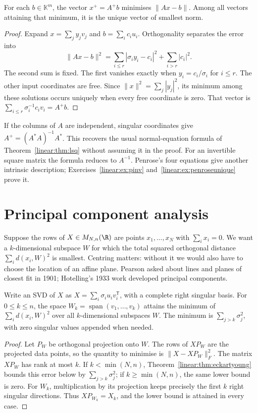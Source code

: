 \begin{theorem}\label{linear:thm:pinv}
For each $b\in\mathbb K^m$, the vector $x^+=A^+b$ minimises $\|Ax-b\|$. Among all vectors attaining that minimum, it is the unique vector of smallest norm.
\end{theorem}
\begin{proof}
Expand $x=\sum_jy_jv_j$ and $b=\sum_ic_iu_i$. Orthogonality separates the error into
\[
\|Ax-b\|^2=\sum_{i\le r}|\sigma_iy_i-c_i|^2+\sum_{i>r}|c_i|^2.
\]
The second sum is fixed. The first vanishes exactly when $y_i=c_i/\sigma_i$ for $i\le r$. The other input coordinates are free. Since $\|x\|^2=\sum_j|y_j|^2$, its minimum among these solutions occurs uniquely when every free coordinate is zero. That vector is $\sum_{i\le r}\sigma_i^{-1}c_iv_i=A^+b$.
\end{proof}

If the columns of $A$ are independent, singular coordinates give $A^+=(A^*A)^{-1}A^*$. This recovers the usual normal-equation formula of Theorem~\ref{linear:thm:lsq} without assuming it in the proof. For an invertible square matrix the formula reduces to $A^{-1}$. Penrose's four equations give another intrinsic description; Exercises~\ref{linear:ex:pinv} and~\ref{linear:ex:penroseunique} prove it.

\section{Principal component analysis}

Suppose the rows of $X\in M_{N,n}(\R)$ are points $x_1,\ldots,x_N$ with $\sum_ix_i=0$. We want a $k$-dimensional subspace $W$ for which the total squared orthogonal distance $\sum_id(x_i,W)^2$ is smallest. Centring matters: without it we would also have to choose the location of an affine plane. Pearson asked about lines and planes of closest fit in 1901; Hotelling's 1933 work developed principal components.

\begin{theorem}\label{linear:thm:pca}
Write an SVD of $X$ as $X=\sum_i\sigma_iu_iv_i^{\mathsf T}$, with a complete right singular basis. For $0\le k\le n$, the space $W_k=\operatorname{span}(v_1,\ldots,v_k)$ attains the minimum of $\sum_id(x_i,W)^2$ over all $k$-dimensional subspaces $W$. The minimum is $\sum_{j>k}\sigma_j^2$, with zero singular values appended when needed.
\end{theorem}
\begin{proof}
Let $P_W$ be orthogonal projection onto $W$. The rows of $XP_W$ are the projected data points, so the quantity to minimise is $\|X-XP_W\|_F^2$. The matrix $XP_W$ has rank at most $k$. If $k<\min(N,n)$, Theorem~\ref{linear:thm:eckartyoung} bounds this error below by $\sum_{j>k}\sigma_j^2$; if $k\ge\min(N,n)$, the same lower bound is zero. For $W_k$, multiplication by its projection keeps precisely the first $k$ right singular directions. Thus $XP_{W_k}=X_k$, and the lower bound is attained in every case.
\end{proof}

